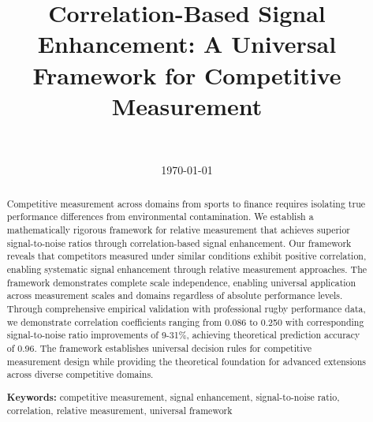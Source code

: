 \documentclass[11pt,a4paper]{article}
\title{Correlation-Based Signal Enhancement: A Universal Framework for Competitive Measurement}
\author{
    \authorone \\
    \textit{\affiliationone}
}
\date{\today}
\begin{document}
\maketitle

\begin{abstract}
Competitive measurement across domains from sports to finance requires isolating true performance differences from environmental contamination. We establish a mathematically rigorous framework for relative measurement that achieves superior signal-to-noise ratios through correlation-based signal enhancement. Our framework reveals that competitors measured under similar conditions exhibit positive correlation, enabling systematic signal enhancement through relative measurement approaches. The framework demonstrates complete scale independence, enabling universal application across measurement scales and domains regardless of absolute performance levels. Through comprehensive empirical validation with professional rugby performance data, we demonstrate correlation coefficients ranging from 0.086 to 0.250 with corresponding signal-to-noise ratio improvements of 9-31\%, achieving theoretical prediction accuracy of 0.96. The framework establishes universal decision rules for competitive measurement design while providing the theoretical foundation for advanced extensions across diverse competitive domains.

\textbf{Keywords:} competitive measurement, signal enhancement, signal-to-noise ratio, correlation, relative measurement, universal framework
\end{abstract}













\end{document}
